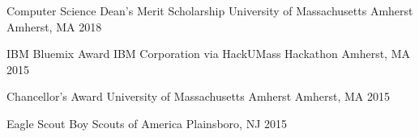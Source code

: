 




\begin{cvhonors}

    \cvhonor
      {Computer Science Dean's Merit Scholarship}
      {University of Massachusetts Amherst}
      {Amherst, MA}
      {2018}

     \cvhonor
    {IBM Bluemix Award} %
    {IBM Corporation via HackUMass Hackathon} %
    {Amherst, MA} %
    {2015} %
      
    \cvhonor
      {Chancellor's Award}
      {University of Massachusetts Amherst}
      {Amherst, MA}
      {2015}
      
    \cvhonor
    {Eagle Scout} %
    {Boy Scouts of America} %
    {Plainsboro, NJ} %
    {2015} %

\end{cvhonors}
